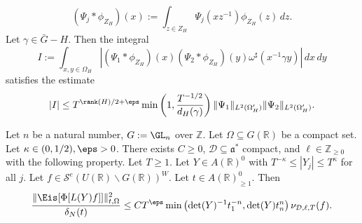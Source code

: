 \begin{theorem}
\begin{enumerate}[(i)]
    \begin{equation*}
      (\Psi_j \ast \phi_{Z_H})(x) := \int_{z \in Z_H} \Psi_j(x z^{-1}) \phi_{Z_H}(z) \, d z.
    \end{equation*}
    Let $\gamma \in \bar{G} - H$.  Then the integral
    \begin{equation*}
      I := \int_{x, y \in \Omega_H }
      \left\lvert
        (\Psi_1 \ast \phi_{Z_H})(x)
        (\Psi_2 \ast \phi_{Z_H})(y)
        \omega^\sharp(x^{-1} \gamma y)
      \right\rvert
      \, d x \, d y
    \end{equation*}
    satisfies the estimate
    \begin{equation*}
      |I| \leq
      T^{\rank(H)/2 + \eps}
      \min\left( 1,
        \frac{T^{-1/2}}{ d_H(\gamma)}
      \right)
      \|\Psi_1\|_{L^2(\Omega_H')}
      \|\Psi_2\|_{L^2(\Omega_H')}.
    \end{equation*}
  \end{enumerate}
\end{theorem}




\begin{theorem}
  Let $n$ be a natural number, $G := \GL_n$ over $\mathbb{Z}$.  Let $\Omega \subseteq G(\mathbb{R})$ be a compact set.  Let $\kappa \in (0, 1/2), \eps > 0$.  There exists $C \geq 0$, $\mathcal{D} \subseteq \mathfrak{a}^*$ compact, and $\ell \in \mathbb{Z}_{\geq 0}$ with the following property.  Let $T \geq 1$.  Let $Y \in A(\mathbb{R})^0$ with $T^{-\kappa} \leq |Y_j| \leq T^{\kappa}$ for all $j$.  Let $f \in \mathcal{S}^e(U(\mathbb{R}) \backslash G(\mathbb{R}))^W$.  Let $t \in A(\mathbb{R})^0_{\geq 1}$.  Then
  \begin{equation*}
    \frac{\|\Eis [ \Phi[L(Y) f] ] \|_{t,\Omega}^2}{\delta_N(t)}
    \leq C T^\eps \min \left( \det(Y)^{-1} t_1^{-n}, \det(Y) t_n^n \right) \nu_{\mathcal{D},\ell,T}(f).
  \end{equation*}
\end{theorem}



